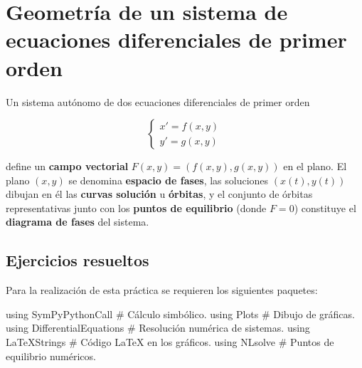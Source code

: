 \documentclass[
  spanish,
  a4paper,
]{scrreport}
\newenvironment{Shaded}{\begin{snugshade}}{\end{snugshade}}
\newcommand{\BuiltInTok}[1]{\textcolor[rgb]{0.00,0.23,0.31}{#1}}
\newcommand{\CommentTok}[1]{\textcolor[rgb]{0.37,0.37,0.37}{#1}}
\newcommand{\ImportTok}[1]{\textcolor[rgb]{0.00,0.46,0.62}{#1}}
\theoremstyle{definition}
\theoremstyle{remark}
\begin{document}

\chapter{Geometría de un sistema de ecuaciones diferenciales de primer
orden}\label{geometruxeda-de-un-sistema-de-ecuaciones-diferenciales-de-primer-orden}

Un sistema autónomo de dos ecuaciones diferenciales de primer orden

\[
\begin{cases}
x' = f(x, y) \\
y' = g(x, y)
\end{cases}
\]

define un \textbf{campo vectorial} \(F(x,y) = (f(x,y), g(x,y))\) en el
plano. El plano \((x,y)\) se denomina \textbf{espacio de fases}, las
soluciones \((x(t), y(t))\) dibujan en él las \textbf{curvas solución} u
\textbf{órbitas}, y el conjunto de órbitas representativas junto con los
\textbf{puntos de equilibrio} (donde \(F=0\)) constituye el
\textbf{diagrama de fases} del sistema.

\section{Ejercicios resueltos}\label{ejercicios-resueltos-1}

Para la realización de esta práctica se requieren los siguientes
paquetes:

\begin{Shaded}
\begin{Highlighting}[]
\ImportTok{using} \BuiltInTok{SymPyPythonCall}        \CommentTok{\# Cálculo simbólico.}
\ImportTok{using} \BuiltInTok{Plots}                  \CommentTok{\# Dibujo de gráficas.}
\ImportTok{using} \BuiltInTok{DifferentialEquations}  \CommentTok{\# Resolución numérica de sistemas.}
\ImportTok{using} \BuiltInTok{LaTeXStrings}           \CommentTok{\# Código LaTeX en los gráficos.}
\ImportTok{using} \BuiltInTok{NLsolve}                \CommentTok{\# Puntos de equilibrio numéricos.}
\end{Highlighting}
\end{Shaded}
\end{document}
